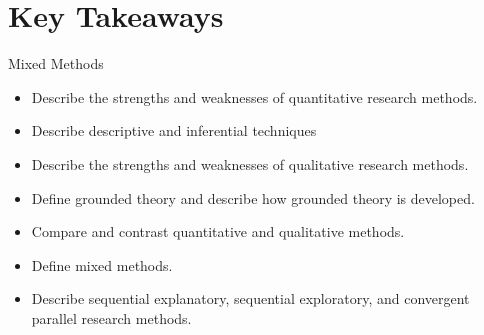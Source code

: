 \section{Key Takeaways}

\begin{center}
	\begin{tkawybox}{Mixed Methods}
		\begin{itemize}
			\setlength{\itemsep}{0pt}
			\setlength{\parskip}{0pt}
			\setlength{\parsep}{0pt}
			
			\item Describe the strengths and weaknesses of quantitative research methods.
			\item Describe descriptive and inferential techniques
			\item Describe the strengths and weaknesses of qualitative research methods.
			\item Define grounded theory and describe how grounded theory is developed.
			\item Compare and contrast quantitative and qualitative methods.
			\item Define mixed methods.
			\item Describe sequential explanatory, sequential exploratory, and convergent parallel research methods.
		\end{itemize}
	\end{tkawybox}
\end{center}
